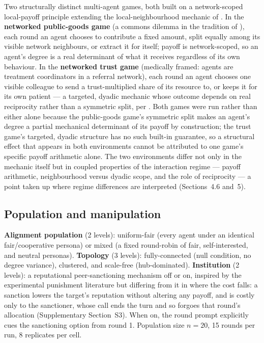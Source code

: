 \documentclass[11pt,a4paper]{article}
\begin{document}
Two structurally distinct multi-agent games, both built on a
network-scoped local-payoff principle extending the local-neighbourhood
mechanic of \citet{Nowak:1992:Spatial}. In the \textbf{networked public-goods
game} (a commons dilemma in the tradition of \citet{Ostrom:1990:Commons}), each
round an agent chooses to contribute a fixed amount, split equally
among its visible network neighbours, or extract it for itself; payoff
is network-scoped, so an agent's degree is a real determinant of
what it receives regardless of its own behaviour. In the
\textbf{networked trust game} (medically framed: agents are treatment
coordinators in a referral network), each round an agent chooses one
visible colleague to send a trust-multiplied share of its resource to,
or keeps it for its own patient --- a targeted, dyadic mechanic whose
outcome depends on real reciprocity rather than a symmetric split, per
\citet{Berg:1995:Trust}. Both games were run rather than either alone because
the public-goods game's symmetric split makes an agent's degree a
partial mechanical determinant of its payoff by construction; the
trust game's targeted, dyadic structure has no such built-in guarantee,
so a structural effect that appears in both environments cannot be
attributed to one game's specific payoff arithmetic alone. The two
environments differ not only in the mechanic itself but in coupled
properties of the interaction regime --- payoff arithmetic,
neighbourhood versus dyadic scope, and the role of reciprocity ---
a point taken up where regime differences are interpreted
(Sections~4.6 and~5).

\subsection{Population and manipulation}

\textbf{Alignment population} (2 levels): uniform-fair (every agent
under an identical fair/cooperative persona) or mixed (a fixed
round-robin of fair, self-interested, and neutral personas).
\textbf{Topology} (3 levels): fully-connected (null condition, no
degree variance), clustered, and scale-free (hub-dominated).
\textbf{Institution} (2 levels): a reputational peer-sanctioning
mechanism off or on, inspired by the experimental punishment
literature \citep{Fehr:2000:Punishment,Fehr:2002:Altruistic} but differing from it in
where the cost falls: a sanction lowers the target's reputation
without altering any payoff, and is costly only to the sanctioner,
whose call ends the turn and so forgoes that round's allocation
(Supplementary Section~S3). When on, the round prompt explicitly cues
the sanctioning option from round 1. Population size $n=20$, 15 rounds
per run, 8 replicates per cell.
\end{document}
